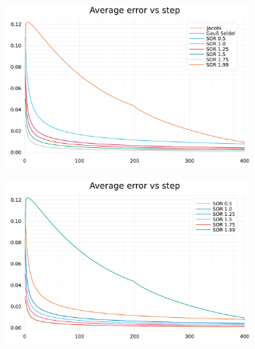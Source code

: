 \documentclass[
	a4paper, %
	10pt, %
]{CSUniSchoolLabReport}
\begin{document}
\begin{figure}[H]
	\centering
	\begin{subfigure}[b]{0.49\textwidth}
			\centering
			\includegraphics[width=\textwidth]{../saves/av_errors_comp.pdf}

			\label{fig:av_errors}
	\end{subfigure}
	\hfill
	\begin{subfigure}[b]{0.49\textwidth}
			\centering
			\includegraphics[width=\textwidth]{../saves/av_errors_SOR_comp.pdf}


\end{subfigure}
\end{figure}
\end{document}
